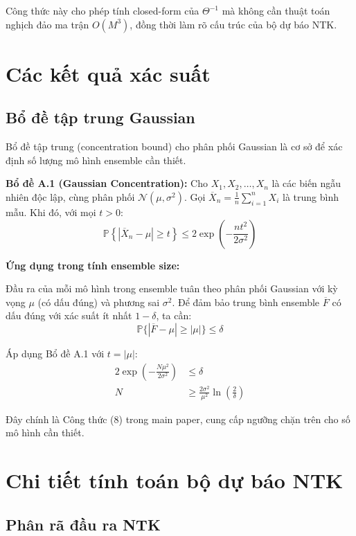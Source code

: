 Công thức này cho phép tính closed-form của $\Theta^{-1}$ mà không cần thuật toán nghịch đảo ma trận $O(M^3)$, đồng thời làm rõ cấu trúc của bộ dự báo NTK.

\section{Các kết quả xác suất}

\subsection{Bổ đề tập trung Gaussian}

Bổ đề tập trung (concentration bound) cho phân phối Gaussian là cơ sở để xác định số lượng mô hình ensemble cần thiết.

\textbf{Bổ đề A.1 (Gaussian Concentration):} Cho $X_1, X_2, \ldots, X_n$ là các biến ngẫu nhiên độc lập, cùng phân phối $\mathcal{N}(\mu, \sigma^2)$. Gọi $\overline{X}_n = \frac{1}{n}\sum_{i=1}^{n} X_i$ là trung bình mẫu. Khi đó, với mọi $t > 0$:
\begin{equation}
    \mathbb{P}\left\{|\overline{X}_n - \mu| \geq t\right\} \leq 2 \exp\left(-\frac{nt^2}{2\sigma^2}\right)
\end{equation}

\textbf{Ứng dụng trong tính ensemble size:}

Đầu ra của mỗi mô hình trong ensemble tuân theo phân phối Gaussian với kỳ vọng $\mu$ (có dấu đúng) và phương sai $\sigma^2$. Để đảm bảo trung bình ensemble $\overline{F}$ có dấu đúng với xác suất ít nhất $1 - \delta$, ta cần:
\begin{equation}
    \mathbb{P}\{|\overline{F} - \mu| \geq |\mu|\} \leq \delta
\end{equation}

Áp dụng Bổ đề A.1 với $t = |\mu|$:
\begin{align}
    2\exp\left(-\frac{N\mu^2}{2\sigma^2}\right) &\leq \delta \\
    N &\geq \frac{2\sigma^2}{\mu^2} \ln\left(\frac{2}{\delta}\right)
\end{align}

Đây chính là Công thức (8) trong main paper, cung cấp ngưỡng chặn trên cho số mô hình cần thiết.

\section{Chi tiết tính toán bộ dự báo NTK}
\subsection{Phân rã đầu ra NTK}

